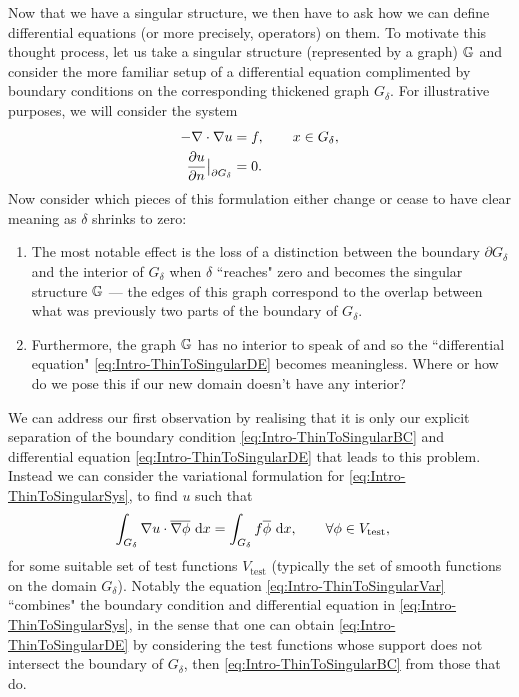 Now that we have a singular structure, we then have to ask how we can define differential equations (or more precisely, operators) on them.
To motivate this thought process, let us take a singular structure (represented by a graph) $\mathbb{G}$ and consider the more familiar setup of a differential equation complimented by boundary conditions on the corresponding thickened graph $G_{\delta}$.
For illustrative purposes, we will consider the system
\begin{subequations} \label{eq:Intro-ThinToSingularSys}
	\begin{align}
		-\nabla\cdot\nabla u &= f, \qquad x\in G_{\delta}, \label{eq:Intro-ThinToSingularDE} \\
		\dfrac{\partial u}{\partial n}\big\vert_{\partial G_{\delta}} &= 0. \label{eq:Intro-ThinToSingularBC}
	\end{align}
\end{subequations}
Now consider which pieces of this formulation either change or cease to have clear meaning as $\delta$ shrinks to zero:
\begin{enumerate}
	\item The most notable effect is the loss of a distinction between the boundary $\partial G_{\delta}$ and the interior of $G_{\delta}$ when $\delta$ ``reaches" zero and becomes the singular structure $\mathbb{G}$ --- the edges of this graph correspond to the overlap between what was previously two parts of the boundary of $G_{\delta}$.
	\item Furthermore, the graph $\mathbb{G}$ has no interior to speak of and so the ``differential equation" \eqref{eq:Intro-ThinToSingularDE} becomes meaningless.
	Where or how do we pose this if our new domain doesn't have any interior?
\end{enumerate}
We can address our first observation by realising that it is only our explicit separation of the boundary condition \eqref{eq:Intro-ThinToSingularBC} and differential equation \eqref{eq:Intro-ThinToSingularDE} that leads to this problem.
Instead we can consider the variational formulation for \eqref{eq:Intro-ThinToSingularSys}, to find $u$ such that
\begin{align} \label{eq:Intro-ThinToSingularVar}
	\int_{G_{\delta}} \nabla u\cdot \overline{\nabla\phi}  \ \mathrm{d}x 
	&= \int_{G_{\delta}} f\overline{\phi}  \ \mathrm{d}x, \qquad\forall\phi\in V_{\mathrm{test}},
\end{align}
for some suitable set of test functions $V_{\mathrm{test}}$ (typically the set of smooth functions on the domain $G_{\delta}$).
Notably the equation \eqref{eq:Intro-ThinToSingularVar} ``combines" the boundary condition and differential equation in \eqref{eq:Intro-ThinToSingularSys}, in the sense that one can obtain \eqref{eq:Intro-ThinToSingularDE} by considering the test functions whose support does not intersect the boundary of $G_{\delta}$, then \eqref{eq:Intro-ThinToSingularBC} from those that do.
